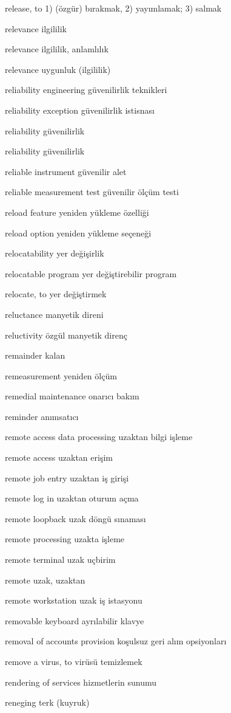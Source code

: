 \documentclass[12pt,fleqn]{article}\usepackage{../../common}
\begin{document}
release, to 1) (özgür) bırakmak, 2) yayımlamak; 3) salmak

relevance ilgililik

relevance ilgililik, anlamlılık

relevance uygunluk (ilgililik)

reliability engineering güvenilirlik teknikleri

reliability exception güvenilirlik istisnası

reliability güvenilirlik

reliability güvenilirlik

reliable instrument güvenilir alet

reliable measurement test güvenilir ölçüm testi

reload feature yeniden yükleme özelliği

reload option yeniden yükleme seçeneği

relocatability yer değişirlik

relocatable program yer değiştirebilir program

relocate, to yer değiştirmek

reluctance manyetik direni

reluctivity özgül manyetik direnç

remainder kalan

remeasurement yeniden ölçüm

remedial maintenance onarıcı bakım

reminder anımsatıcı

remote access data processing uzaktan bilgi işleme

remote access uzaktan erişim

remote job entry uzaktan iş girişi

remote log in uzaktan oturum açma

remote loopback uzak döngü sınaması

remote processing uzakta işleme

remote terminal uzak uçbirim

remote uzak, uzaktan

remote workstation uzak iş istasyonu

removable keyboard ayrılabilir klavye

removal of accounts provision koşulsuz geri alım opsiyonları

remove a virus, to virüsü temizlemek

rendering of services hizmetlerin sunumu

reneging terk (kuyruk)
\end{document}
